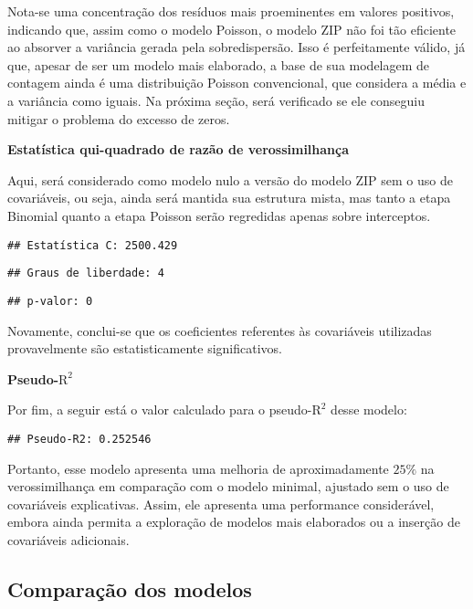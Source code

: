 \documentclass[
  twocolumn]{article}
\begin{document}
Nota-se uma concentração dos resíduos mais proeminentes em valores
positivos, indicando que, assim como o modelo Poisson, o modelo ZIP não
foi tão eficiente ao absorver a variância gerada pela sobredispersão.
Isso é perfeitamente válido, já que, apesar de ser um modelo mais
elaborado, a base de sua modelagem de contagem ainda é uma distribuição
Poisson convencional, que considera a média e a variância como iguais.
Na próxima seção, será verificado se ele conseguiu mitigar o problema do
excesso de zeros.

\textbf{Estatística qui-quadrado de razão de verossimilhança}

Aqui, será considerado como modelo nulo a versão do modelo ZIP sem o uso
de covariáveis, ou seja, ainda será mantida sua estrutura mista, mas
tanto a etapa Binomial quanto a etapa Poisson serão regredidas apenas
sobre interceptos.

\begin{verbatim}
## Estatística C: 2500.429
\end{verbatim}

\begin{verbatim}
## Graus de liberdade: 4
\end{verbatim}

\begin{verbatim}
## p-valor: 0
\end{verbatim}

Novamente, conclui-se que os coeficientes referentes às covariáveis
utilizadas provavelmente são estatisticamente significativos.

\textbf{Pseudo-\(\text{R}^2\)}

Por fim, a seguir está o valor calculado para o pseudo-\(\text{R}^2\)
desse modelo:

\begin{verbatim}
## Pseudo-R2: 0.252546
\end{verbatim}

Portanto, esse modelo apresenta uma melhoria de aproximadamente \(25\%\)
na verossimilhança em comparação com o modelo minimal, ajustado sem o
uso de covariáveis explicativas. Assim, ele apresenta uma performance
considerável, embora ainda permita a exploração de modelos mais
elaborados ou a inserção de covariáveis adicionais.

\subsection{Comparação dos modelos}\label{comparauxe7uxe3o-dos-modelos}
\end{document}
